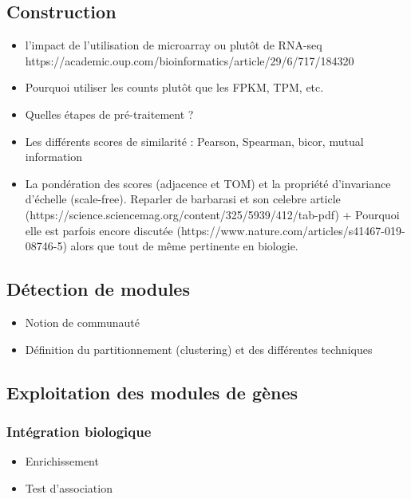 \subsection{Construction}
\begin{itemize}
\item l'impact de l'utilisation de microarray ou plutôt de RNA-seq https://academic.oup.com/bioinformatics/article/29/6/717/184320
\item Pourquoi utiliser les counts plutôt que les FPKM, TPM, etc.
\item Quelles étapes de pré-traitement ?
\item Les différents scores de similarité : Pearson, Spearman, bicor, mutual information
\item La pondération des scores (adjacence et TOM) et la propriété d'invariance d'échelle (scale-free). Reparler de barbarasi et son celebre article (https://science.sciencemag.org/content/325/5939/412/tab-pdf) + Pourquoi elle est parfois encore discutée (https://www.nature.com/articles/s41467-019-08746-5) alors que tout de même pertinente en biologie. 
\end{itemize}
\subsection{Détection de modules}
\begin{itemize}
    \item Notion de communauté
    \item Définition du partitionnement (clustering) et des différentes techniques
\end{itemize}

\subsection{Exploitation des modules de gènes}

\subsubsection{Intégration biologique}
\begin{itemize}
    \item Enrichissement
    \item Test d'association
\end{itemize}

